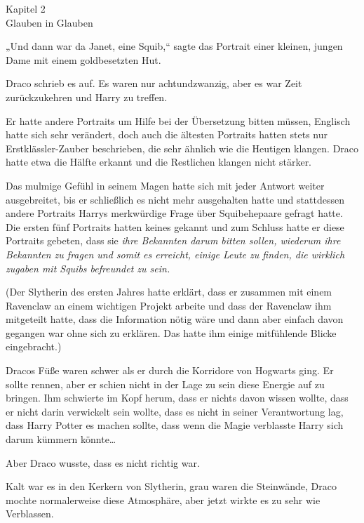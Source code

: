 

\hypertarget{glauben-in-glauben}{%

Kapitel 2\\ Glauben in Glauben

„Und dann war da Janet, eine Squib,“ sagte das Portrait einer kleinen, jungen Dame mit einem goldbesetzten Hut.

Draco schrieb es auf. Es waren nur achtundzwanzig, aber es war Zeit zurückzukehren und Harry zu treffen.

Er hatte andere Portraits um Hilfe bei der Übersetzung bitten müssen, Englisch hatte sich sehr verändert, doch auch die ältesten Portraits hatten stets nur Erstklässler-Zauber beschrieben, die sehr ähnlich wie die Heutigen klangen. Draco hatte etwa die Hälfte erkannt und die Restlichen klangen nicht stärker.

Das mulmige Gefühl in seinem Magen hatte sich mit jeder Antwort weiter ausgebreitet, bis er schließlich es nicht mehr ausgehalten hatte und stattdessen andere Portraits Harrys merkwürdige Frage über Squibehepaare gefragt hatte. Die ersten fünf Portraits hatten keines gekannt und zum Schluss hatte er diese Portraits gebeten, dass sie \emph{ihre Bekannten darum bitten sollen, wiederum \emph{ihre} Bekannten zu fragen und somit es erreicht, einige Leute zu finden, die wirklich zugaben mit Squibs befreundet zu sein.}

(Der Slytherin des ersten Jahres hatte erklärt, dass er zusammen mit einem Ravenclaw an einem wichtigen Projekt arbeite und dass der Ravenclaw ihm mitgeteilt hatte, dass die Information nötig wäre und dann aber einfach davon gegangen war ohne sich zu erklären. Das hatte ihm einige mitfühlende Blicke eingebracht.)

Dracos Füße waren schwer als er durch die Korridore von Hogwarts ging. Er sollte rennen, aber er schien nicht in der Lage zu sein diese Energie auf zu bringen. Ihm schwierte im Kopf herum, dass er nichts davon wissen wollte, dass er nicht darin verwickelt sein wollte, dass es nicht in seiner Verantwortung lag, dass Harry Potter es machen sollte, dass wenn die Magie verblasste Harry sich darum kümmern könnte…

Aber Draco wusste, dass es nicht richtig war.

Kalt war es in den Kerkern von Slytherin, grau waren die Steinwände, Draco mochte normalerweise diese Atmosphäre, aber jetzt wirkte es zu sehr wie Verblassen.

}

